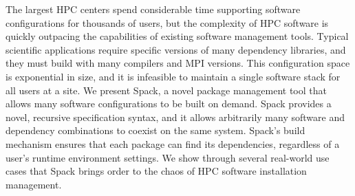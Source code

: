 
The largest HPC centers spend considerable time supporting software configurations for thousands of users, but the complexity of HPC software is quickly outpacing the capabilities of existing software management tools. Typical scientific applications require specific versions of many dependency libraries, and they must build with many compilers and MPI versions. This configuration space is exponential in size, and it is infeasible to maintain a single software stack for all users at a site.  We present Spack, a novel package management tool that allows many software configurations to be built on demand. Spack provides a novel, recursive specification syntax, and it allows arbitrarily many software and dependency combinations to coexist on the same system. Spack's build mechanism ensures that each package can find its dependencies, regardless of a user's runtime environment settings. We show through several real-world use cases that Spack brings order to the chaos of HPC software installation management.
